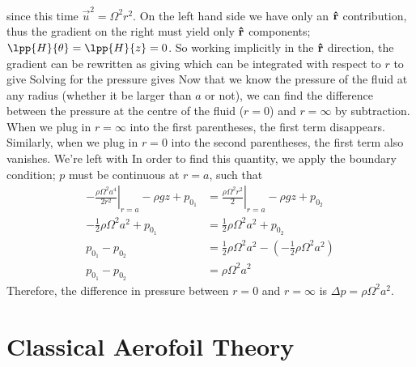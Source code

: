 \documentclass[12pt]{book}
\begin{document}
{since this time $\vec u ^ 2 = \Omega^2r^2$. On the left hand side we have only an $\boldsymbol{\hat{\textbf{r}}}$ contribution, thus the gradient on the right must yield only $\boldsymbol{\hat{\textbf{r}}}$ components; $\lpp{H}{\theta} = \lpp{H}{z} = 0$. So working  implicitly in the $\boldsymbol{\hat{\textbf{r}}}$ direction, the gradient can be rewritten as  giving
which can be integrated with respect to $r$
to give
Solving for the pressure gives
Now that we know the pressure of the fluid at any radius (whether it be larger than $a$ or not), we can find the difference between the pressure at the centre of the fluid ($r=0$) and $r=\infty$ by subtraction.
When we plug in $r=\infty$ into the first parentheses, the first term disappears.  Similarly, when we plug in $r=0$ into the second parentheses, the first term also vanishes.  We're left with
In order to find this quantity, we apply the boundary condition; $p$ must be continuous at $r=a$, such that
\begin{align*}
\left. -\frac{\rho\Omega^2a^4}{2r^2}\right|_{r=a} - \rho g z + p_{0_1} &= \left.\frac{\rho \Omega^2r^2}{2}\right|_{r=a} - \rho g z + p_{0_2} \\[1em]
-\frac{1}{2}\rho\Omega^2a^2 + p_{0_1} &= \frac{1}{2}\rho \Omega^2a^2 + p_{0_2} \\[1em]
 p_{0_1} - p_{0_2} &= \frac{1}{2}\rho \Omega^2a^2 - (-\frac{1}{2}\rho\Omega^2a^2) \\
 p_{0_1} - p_{0_2} &= \rho \Omega^2a^2
\end{align*}
Therefore, the difference in pressure between $r=0$ and $r=\infty$ is $\Delta p =  \rho \Omega^2a^2$.
}


\stopAssignment

















\chapter{Classical Aerofoil Theory}\label{chapter:classicalaerofoiltheory}
\end{document}
